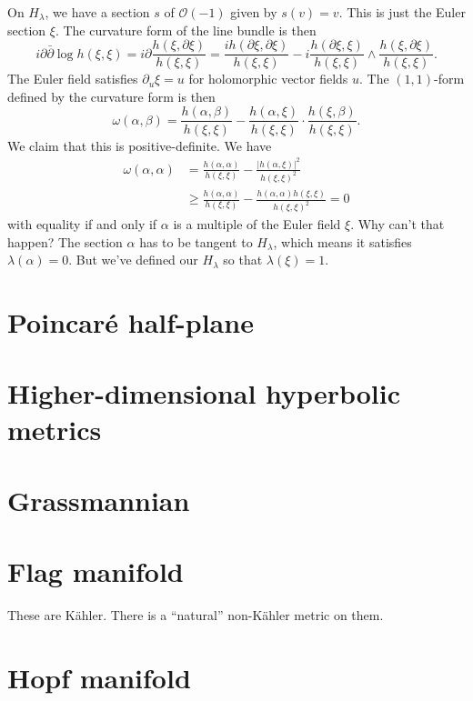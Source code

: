 \documentclass[11pt]{article}
\newcommand{\cc}[1]{\mathcal{#1}}
\begin{document}
On $H_\lambda$, we have a section $s$ of $\cc O(-1)$ given by $s(v) = v$. This is just the Euler section $\xi$. The curvature form of the line bundle is then
$$
i \partial \bar\partial \log h(\xi, \xi)
= i\partial \frac{h(\xi, \partial \xi)}{h(\xi, \xi)}
= \frac{i h(\partial \xi, \partial \xi)}{h(\xi, \xi)}
- i\frac{h(\partial \xi, \xi)}{h(\xi, \xi)} \wedge \frac{h(\xi, \partial \xi)}{h(\xi, \xi)}.
$$
The Euler field satisfies $\partial_u \xi = u$ for holomorphic vector fields $u$. The $(1,1)$-form defined by the curvature form is then
$$
\omega(\alpha, \beta)
= \frac{h(\alpha, \beta)}{h(\xi, \xi)}
- \frac{h(\alpha, \xi)}{h(\xi, \xi)} \cdot \frac{h(\xi, \beta)}{h(\xi, \xi)}.
$$
We claim that this is positive-definite. We have
\begin{align*}
  \omega(\alpha, \alpha)
&= \frac{h(\alpha, \alpha)}{h(\xi, \xi)}
- \frac{|h(\alpha, \xi)|^2}{h(\xi, \xi)^2}
\\
&\geq \frac{h(\alpha, \alpha)}{h(\xi, \xi)}
- \frac{h(\alpha, \alpha) h(\xi, \xi)}{h(\xi, \xi)^2}
= 0
\end{align*}
with equality if and only if $\alpha$ is a multiple of the Euler field $\xi$. Why can't that happen? The section $\alpha$ has to be tangent to $H_\lambda$, which means it satisfies $\lambda(\alpha) = 0$. But we've defined our $H_\lambda$ so that $\lambda(\xi) = 1$.

\section{Poincaré half-plane}
\label{sec:orgfbd87cb}

\section{Higher-dimensional hyperbolic metrics}
\label{sec:org21fa1aa}

\section{Grassmannian}
\label{sec:org34425b6}

\section{Flag manifold}
\label{sec:orga0ef6a0}

These are K\"ahler. There is a ``natural'' non-K\"ahler metric on them.

\section{Hopf manifold}
\label{sec:org8f5818e}
\end{document}
